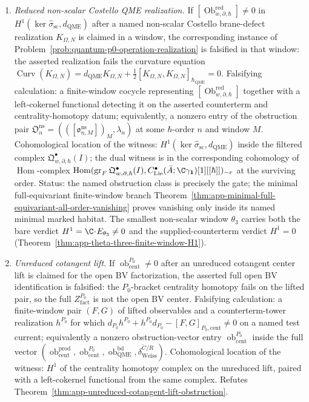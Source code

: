 \begin{enumerate}
\item[\((F5)\)] \emph{Reduced non-scalar Costello QME realization.}
  If \([\operatorname{Ob}^{\mathrm{red}}_{w,\partial,\hbar}]\ne0\) in
  \(H^1(\ker\widehat\sigma_{\mathrm{sc}},d_{\mathrm{QME}})\) after a
  named non-scalar Costello brane-defect realization \(K_{\Omega,N}\)
  is claimed in a window, the corresponding instance of
  Problem~\ref{prob:quantum-p0-operation-realization} is falsified in
  that window: the asserted realization fails the curvature equation
  \(\operatorname{Curv}(K_{\Omega,N})=
  d_{\mathrm{QME}}K_{\Omega,N}+\frac12[K_{\Omega,N},
  K_{\Omega,N}]_{\hbar_{\mathrm{QME}}}=0\).
  Falsifying calculation: a finite-window cocycle representing
  \([\operatorname{Ob}^{\mathrm{red}}_{w,\partial,\hbar}]\) together
  with a left-cokernel functional detecting it on the asserted
  counterterm and centrality-homotopy datum; equivalently, a nonzero
  entry of the obstruction pair
  \(\mathfrak O_n^{\mathrm{ns}}=
  (([\mathfrak o^{\mathrm{ns}}_{n,M}])_M,\lambda_n)\) at some
  \(\hbar\)-order \(n\) and window \(M\).
  Cohomological location of the witness:
  \(H^1(\ker\widehat\sigma_{\mathrm{sc}},d_{\mathrm{QME}})\) inside the
  filtered complex
  \(\mathfrak Q^\bullet_{w,\partial,\hbar}(I)\); the dual witness is
  in the corresponding cohomology of \(\operatorname{Hom}\)-complex
  \(\operatorname{Hom}(\operatorname{gr}_F\mathfrak Q^\bullet_{w,
  \partial,\hbar}(I),C^\bullet_{\mathrm{Lie}}(\bar A;
  \C\gamma_{\mathbf 1})[1][[\hbar]])_{-r}\) at the surviving order.
  Status: the named obstruction class is precisely the gate; the
  minimal full-equivariant finite-window branch
  Theorem~\ref{thm:app-minimal-full-equivariant-all-order-vanishing}
  proves vanishing only inside its named minimal marked habitat.  The
  smallest non-scalar window \(\theta_3\) carries both the bare
  verdict \(H^1=\C\!\cdot\!E_{\theta_3}\ne0\) and the
  supplied-counterterm verdict \(H^1=0\)
  (Theorem~\ref{thm:app-theta-three-finite-window-H1}).

\item[\((F6)\)] \emph{Unreduced cotangent lift.}
  If \(\operatorname{ob}^{P_0}_{\mathrm{cent}}\ne0\) after an unreduced
  cotangent center lift is claimed for the open BV factorization, the
  asserted full open BV identification is falsified: the
  \(P_0\)-bracket centrality homotopy fails on the lifted pair, so the
  full \(Z^{P_0}_{\mathrm{fact}}\) is not the open BV center.
  Falsifying calculation: a finite-window pair \((F,G)\) of lifted
  observables and a counterterm-tower realization \(h^{P_0}\) for which
  \(d_{P_0}h^{P_0}+h^{P_0}d_{P_0}-[F,G]_{P_0,\mathrm{cent}}\ne0\) on a
  named test current; equivalently a nonzero obstruction-vector entry
  \(\operatorname{ob}^{P_0}_{\mathrm{cent}}\) inside the full vector
  \((\operatorname{ob}^{\mathrm{prod}}_{\mathrm{cent}},
  \operatorname{ob}^{P_0}_{\mathrm{cent}},
  \operatorname{ob}^{\mathrm{bd}}_{\mathrm{QME}},
  \delta_{\mathrm{Weiss}}^{\check C/R})\).
  Cohomological location of the witness:
  \(H^1\) of the centrality homotopy complex on the unreduced lift,
  paired with a left-cokernel functional from the same complex.
  Refutes Theorem~\ref{thm:app-unreduced-cotangent-lift-obstruction}.


\end{enumerate}
